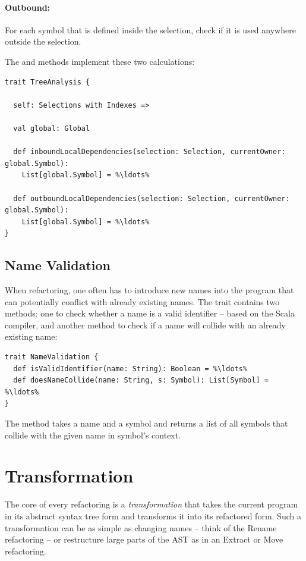 \paragraph{Outbound:} For each symbol that is defined inside the selection, check if it is used anywhere outside the selection.

The  and  methods implement these two calculations:

\begin{lstlisting}
trait TreeAnalysis {
  
  self: Selections with Indexes =>
  
  val global: Global
  
  def inboundLocalDependencies(selection: Selection, currentOwner: global.Symbol): 
    List[global.Symbol] = %\ldots%
  
  def outboundLocalDependencies(selection: Selection, currentOwner: global.Symbol): 
    List[global.Symbol] = %\ldots%
}
\end{lstlisting}

\subsection{Name Validation}

When refactoring, one often has to introduce new names into the program that can potentially conflict with already existing names. The  trait contains two methods: one to check whether a name is a valid identifier -- based on the Scala compiler, and another method to check if a name will collide with an already existing name:

\begin{lstlisting}
trait NameValidation {
  def isValidIdentifier(name: String): Boolean = %\ldots%
  def doesNameCollide(name: String, s: Symbol): List[Symbol] = %\ldots%
}
\end{lstlisting}

The  method takes a name and a symbol and returns a list of all symbols that collide with the given name in symbol's context.

\newpage
\section{Transformation} \label{section:transformation}

The core of every refactoring is a \textit{transformation} that takes the current program in its abstract syntax tree form and transforms it into its refactored form. Such a transformation can be as simple as changing names -- think of the Rename refactoring -- or restructure large parts of the AST as in an Extract or Move refactoring. 

